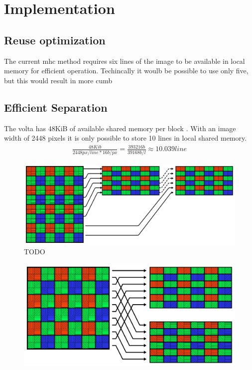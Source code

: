 \section{Implementation}
\subsection{Reuse optimization}
The current \gls{mhc} method requires six lines of the image to be available in local memory for efficient operation.
Techincally it woulb be possible to use only five, but this would result in more cumb

\subsection{Efficient Separation}
The \gls{volta} has 48KiB of available shared memory per block \cite{rigerunNVIDIAJetsonXavier2023}.
With an image width of 2448 pixels \cite{lucidvisionlabsTriton0MPPolarization} it is only possible to store 10 lines in local shared memory.
\begin{align}
    \frac{48Kib}{2448px/line * 16b/px} = \frac{393216b}{39168b/l} \approx 10.039line
\end{align}
\begin{figure}
    \centering
    \includegraphics[width=\textwidth]{figures/polarized_image/read_line.pdf}
    \caption{TODO}
\end{figure}

\begin{figure}[H]
    \centering
    \includegraphics[width=\textwidth]{figures/polarized_image/separation.pdf}
\end{figure}

